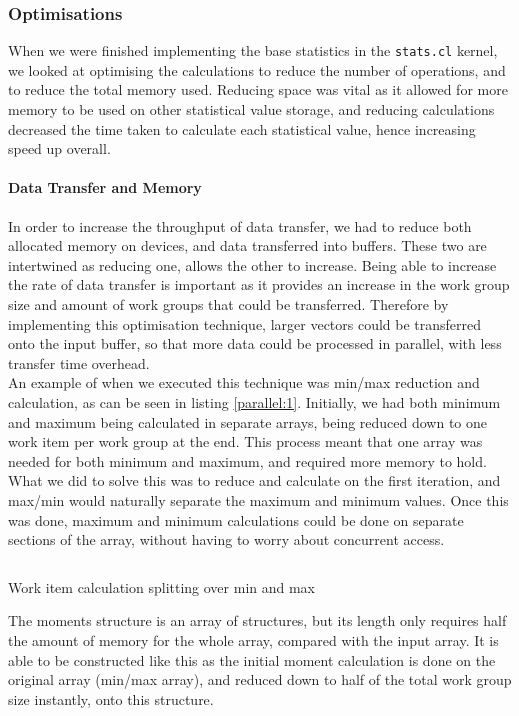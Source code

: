 \subsubsection{Optimisations}
When we were finished implementing the base statistics in the \texttt{stats.cl} kernel, we looked at optimising the calculations to reduce the number of operations, and to reduce the total memory used. Reducing space was vital as it allowed for more memory to be used on other statistical value storage, and reducing calculations decreased the time taken to calculate each statistical value, hence increasing speed up overall.

\paragraph{Data Transfer and Memory}
In order to increase the throughput of data transfer, we had to reduce both allocated memory on devices, and data transferred into buffers. These two are intertwined as reducing one, allows the other to increase. Being able to increase the rate of data transfer is important as it provides an increase in the work group size and amount of work groups that could be transferred. Therefore by implementing this optimisation technique, larger vectors could be transferred onto the input buffer, so that more data could be processed in parallel, with less transfer time overhead.\\

An example of when we executed this technique was min/max reduction and calculation, as can be seen in listing \ref{parallel:1}. Initially, we had both minimum and maximum being calculated in separate arrays, being reduced down to one work item per work group at the end. This process meant that one array was needed for both minimum and maximum, and required more memory to hold. What we did to solve this was to reduce and calculate on the first iteration, and max/min would naturally separate the maximum and minimum values. Once this was done, maximum and minimum calculations could be done on separate sections of the array, without having to worry about concurrent access.\\

\begin{listing}[ht]
\inputminted{c++}{maxmin.cpp}
\vspace{-16pt}
\caption{Work item calculation splitting over min and max}
\label{parallel:1}
\end{listing}

The moments structure is an array of structures, but its length only requires half the amount of memory for the whole array, compared with the input array. It is able to be constructed like this as the initial moment calculation is done on the original array (min/max array), and reduced down to half of the total work group size instantly, onto this structure.\\

